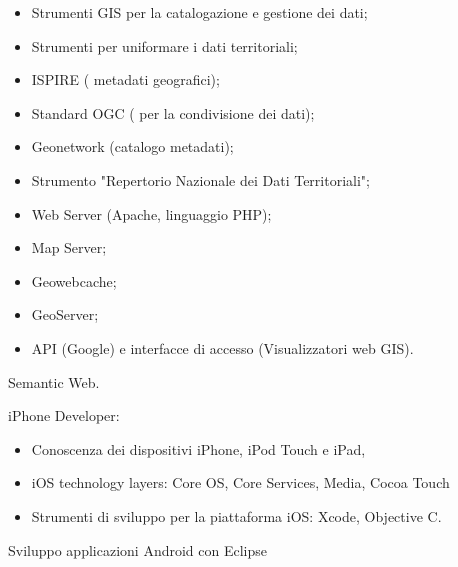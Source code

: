 \documentclass[totpages,helvetica,openbib,italian]{europecv}
\begin{document}
\begin{europecv}
{\begin{minipage}[t]{1\linewidth}
\begin{itemize}
  \vspace{-3mm}\item[]  Strumenti GIS per la catalogazione e gestione dei dati;
\vspace{-3mm}\item[]    Strumenti per uniformare i dati territoriali;
    \vspace{-3mm}\item[] ISPIRE ( metadati geografici);
\vspace{-3mm}\item[]    Standard OGC ( per la condivisione dei dati);
    \vspace{-3mm}\item[]Geonetwork (catalogo metadati);
\vspace{-3mm}\item[]    Strumento "Repertorio Nazionale dei Dati Territoriali";
\vspace{-3mm}\item[]    Web Server (Apache, linguaggio PHP);
\vspace{-3mm}\item[]    Map Server;
\vspace{-3mm}\item[]    Geowebcache;
\vspace{-3mm}\item[]    GeoServer;
\vspace{-3mm}\item[]    API (Google) e interfacce di accesso (Visualizzatori web GIS).
    \end{itemize}

Semantic Web.
\vspace{1mm}
\vspace{1mm}

iPhone Developer:
\begin{itemize}

\vspace{-3mm}\item[]    Conoscenza dei dispositivi iPhone, iPod Touch e iPad,
\vspace{-3mm}\item[]    iOS technology layers: Core OS, Core Services, Media, Cocoa Touch
 \vspace{-3mm}\item[]   Strumenti di sviluppo per la piattaforma iOS: Xcode, Objective C.
    \end{itemize}
Sviluppo applicazioni Android con Eclipse\\
\vspace{1mm}


\end{minipage}}
\end{europecv}
\end{document}
